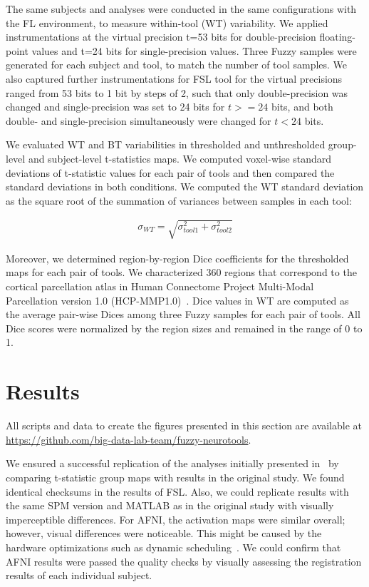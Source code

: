 \documentclass[conference]{IEEEtran}
\begin{document}
The same subjects and analyses were conducted in the same configurations
with the FL environment, to measure within-tool (WT) variability. We
applied instrumentations at the virtual precision t=53 bits for
double-precision floating-point values and t=24 bits for single-precision
values. Three Fuzzy samples were generated for each subject and tool, to
match the number of tool samples.
We also captured further instrumentations for FSL tool for the virtual precisions ranged from 53 bits to 1 bit by steps of 2,
such that only double-precision was changed and single-precision was set to 24 bits for $t >= 24$ bits,
and both double- and single-precision simultaneously were changed for $t < 24$ bits.

We evaluated WT and BT variabilities in thresholded and unthresholded group-level and subject-level t-statistics maps.
We computed voxel-wise standard deviations of t-statistic values for each pair of tools
and then compared the standard deviations in both conditions.
We computed the WT standard deviation as the square root of the summation of variances between samples in each tool:

\begin{equation} \label{eq:mca_std}
  \begin{multlined}
  \sigma_{WT} = \sqrt{\sigma_{tool1}^2 + \sigma_{tool2}^2}
  \end{multlined}
\end{equation}

Moreover, we determined region-by-region Dice coefficients for the thresholded maps for each pair of tools.
We characterized 360 regions that correspond to the cortical parcellation atlas
in Human Connectome Project Multi-Modal Parcellation version 1.0 (HCP-MMP1.0)~\cite{glasser2016multi}.
Dice values in WT are computed as the average pair-wise Dices among three Fuzzy samples for each pair of tools.
All Dice scores were normalized by the region sizes and remained in the range of 0 to 1.

\section{Results}
All scripts and data to create the figures presented in this section are available at \url{https://github.com/big-data-lab-team/fuzzy-neurotools}.

We ensured a successful replication of the analyses initially presented in~\cite{bowring2019exploring}
by comparing t-statistic group maps with results in the original study.
We found identical checksums in the results of FSL.
Also, we could replicate results with the same SPM version and MATLAB as in the original study with visually imperceptible differences.
For AFNI, the activation maps were similar overall; however, visual differences were noticeable.
This might be caused by the hardware optimizations such as dynamic scheduling~\cite{demmel2013numerical}.
We could confirm that AFNI results were passed the quality checks by visually assessing the registration results of each individual subject.
\end{document}
